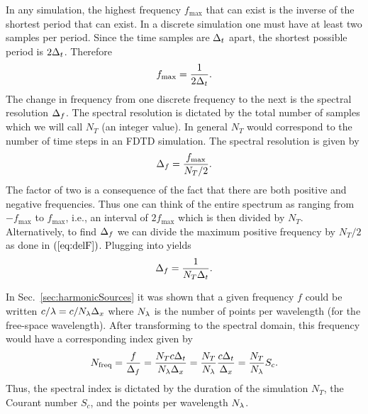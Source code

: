 In any simulation, the highest frequency $f_{\mathrm{max}}$ that can
exist is the inverse of the shortest period that can exist.  In a
discrete simulation one must have at least two samples per period.
Since the time samples are $\Delta_t$ apart, the shortest possible period
is $2\Delta_t$.  Therefore
\begin{equation}
  f_{\mathrm{max}} = \frac{1}{2\Delta_t}.
  \label{eq:fMax}
\end{equation}
The change in frequency from one discrete frequency to the next is the
spectral resolution $\Delta_f$.  The spectral resolution is dictated
by the total number of samples which we will call $N_T$ (an integer
value).  In general $N_T$ would correspond to the number of time steps
in an FDTD simulation.  The spectral resolution is given by
\begin{equation}
  \Delta_f = \frac{f_{\mathrm{max}}}{N_T/2}.
  \label{eq:delF}
\end{equation}
The factor of two is a consequence of the fact that there are both
positive and negative frequencies.  Thus one can think of the entire
spectrum as ranging from $-f_{\mathrm{max}}$ to $f_{\mathrm{max}}$,
i.e., an interval of $2f_{\mathrm{max}}$ which is then divided by
$N_T$.  Alternatively, to find $\Delta_f$ we can divide the maximum
positive frequency by $N_T/2$ as done in $\refeq{eq:delF}$.  Plugging
 into  yields
\begin{equation}
  \Delta_f = \frac{1}{N_T\Delta_t}.
\end{equation}

In Sec.\ \ref{sec:harmonicSources} it was shown that a given frequency
$f$ could be written $c/\lambda=c/N_\lambda\Delta_x$ where $N_\lambda$ is the
number of points per wavelength (for the free-space wavelength).
After transforming to the spectral domain, this frequency would have a
corresponding index given by
\begin{equation}
  N_{\mathrm{freq}} = \frac{f}{\Delta_f} 
  = \frac{N_T c \Delta_t}{N_\lambda\Delta_x} 
  = \frac{N_T}{N_\lambda} \frac{c \Delta_t}{\Delta_x}
  = \frac{N_T}{N_\lambda} S_c.
  \label{eq:spectralIndex}
\end{equation}
Thus, the spectral index is dictated by the duration of the simulation
$N_T$, the Courant number $S_c$, and the points per wavelength $N_\lambda$.

